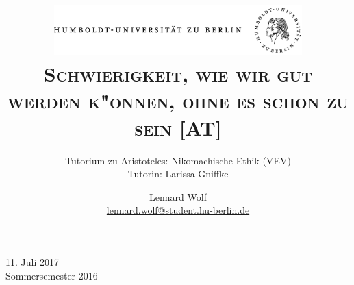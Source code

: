 \documentclass[a4paper, emulatestandardclasses, 12pt]{scrartcl}
\date{\vspace{-3ex}}
\begin{document}
\title{\vspace{5ex}
	\includegraphics*[width=0.72\textwidth]{ErstesSem/images/hu_logo.png}\\
	\vspace{30pt}
	\scshape\LARGE{Schwierigkeit, wie wir gut werden k"onnen, ohne es schon zu sein [AT]}}
	
	\subtitle{\vspace{20pt}Tutorium zu Aristoteles: Nikomachische Ethik (VEV)\\
	\vspace{6pt}
          Tutorin: Larissa Gniffke}


\author{\vspace{-4pt}Lennard Wolf\\
        \small{\href{mailto:lennard.wolf@student.hu-berlin.de}{lennard.wolf@student.hu-berlin.de}}}      

\maketitle

\vspace{\fill}

\begin{minipage}[b]{\textwidth}
    \centering
    \onehalfspacing
    \large   
    11. Juli 2017\\
    Sommersemester 2016

    \vspace{-20mm} 
\end{minipage}%
\thispagestyle{empty}
\newpage
\setcounter{page}{1}
\end{document}

